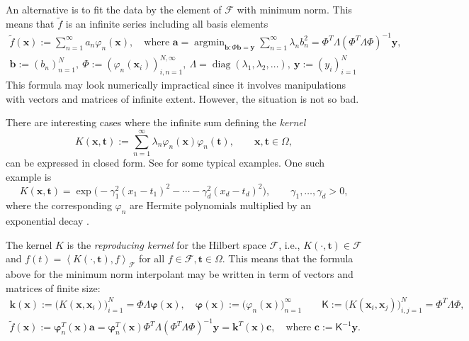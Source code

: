 \documentclass[11pt]{NSFamsart}
\newcommand{\tf}{\tilde{f}}
\newcommand{\mK}{\mathsf{K}}
\newcommand{\mPhi}{\mathsf{\Phi}}
\newcommand{\mLambda}{\mathsf{\Lambda}}
\DeclareMathOperator*{\argmin}{argmin}
\newcommand{\ba}{{\boldsymbol{a}}}
\newcommand{\bb}{{\boldsymbol{b}}}
\newcommand{\bc}{{\boldsymbol{c}}}
\newcommand{\bx}{{\boldsymbol{x}}}
\newcommand{\bk}{{\boldsymbol{k}}}
\newcommand{\by}{{\boldsymbol{y}}}
\newcommand{\bt}{{\boldsymbol{t}}}
\newcommand{\bvarphi}{{\boldsymbol{\varphi}}}
\newcommand{\calf}{{\mathcal{F}}}
\newcommand{\ip}[3][{}]{\ensuremath{\left \langle #2, #3 \right \rangle_{#1}}}
\DeclareMathOperator{\diag}{diag}
\begin{document}
An alternative is to fit the data by the element of $\calf$ with minimum norm.  This means that $\tf$ is an infinite series including all basis elements
\begin{gather*}
\tf(\bx) := \sum_{n=1}^\infty a_n \varphi_n(\bx), \quad \text{where }\ba=\argmin_{\bb: \mPhi\bb=\by} \sum_{n=1}^{\infty} \lambda_n b_n^2 = \mPhi^T \mLambda (\mPhi^T\mLambda\mPhi)^{-1}  \by, \\
\bb:=(b_n)_{n=1}^{N}, \ \mPhi:=(\varphi_n(\bx_i))_{i,n=1}^{N,\infty}, \ \mLambda=\diag(\lambda_1, \lambda_2, \ldots), \ \by:=(y_i)_{i=1}^{N}
\end{gather*}
This formula may look numerically impractical since it involves manipulations with vectors and matrices of infinite extent.  However, the situation is not so bad.

There are interesting cases where the infinite sum defining the \emph{kernel}
\begin{equation}\label{HSseries}
K(\bx,\bt) := \sum_{n=1}^\infty \lambda_n \varphi_n(\bx) \varphi_n(\bt),\qquad \bx,\bt \in \Omega,
\end{equation}
can be expressed in closed form.  See \cite{???} for some typical examples.  One such example is 
\begin{equation}  \label{gausskernel}
K(\bx,\bt) = \exp\bigl(-\gamma_1^2 (x_1-t_1)^2 - \cdots - \gamma_d^2 (x_d-t_d)^2 \bigr), \qquad \gamma_1,\ldots,\gamma_d >0,
\end{equation}
where the corresponding $\varphi_n$ are Hermite polynomials multiplied by an exponential decay \citep{???}.

The kernel $K$ is the \emph{reproducing kernel} for the Hilbert space $\calf$, i.e., $K(\cdot, \bt) \in \calf$ and $f(t)=\ip[\calf]{K(\cdot, \bt)}{f}$ for all $f \in \calf, \bt \in \Omega$.  This means that the formula above for the minimum norm interpolant may be written in term of vectors and matrices of finite size:
\begin{gather}
\nonumber
\bk(\bx) := \bigl(K(\bx,\bx_i)\bigr)_{i=1}^N = \mPhi \mLambda \bvarphi(\bx), \quad \bvarphi(\bx):=\bigl(\varphi_n(\bx)\bigr)_{n=1}^{\infty} \qquad \mK:=\bigl(K(\bx_i,\bx_j)\bigr)_{i,j=1}^N=\mPhi^T\mLambda\mPhi, \\
\label{meshfreeapprox}
\tf(\bx) := \bvarphi_n^T(\bx) \ba  = \bvarphi_n^T(\bx)\mPhi^T \mLambda (\mPhi^T\mLambda\mPhi)^{-1}  \by = \bk^T(\bx)\bc, \quad \text{where }\bc:= \mK^{-1} \by.
\end{gather}
\end{document}
